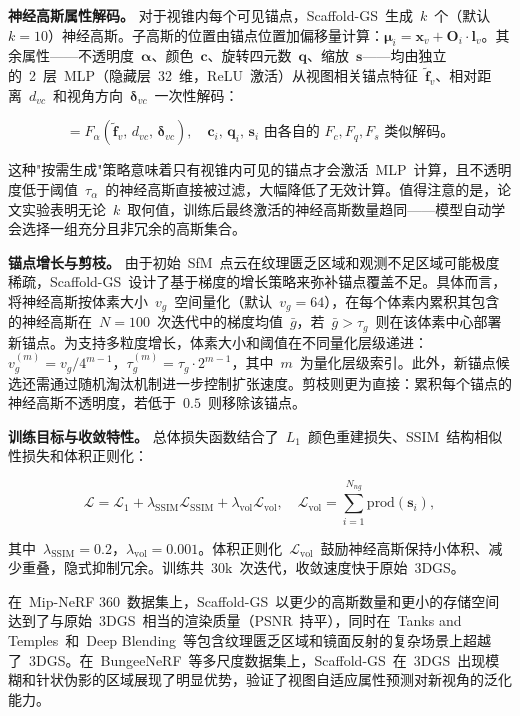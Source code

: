 \textbf{神经高斯属性解码。}
对于视锥内每个可见锚点，Scaffold-GS~生成~$k$~个（默认~$k=10$）神经高斯。子高斯的位置由锚点位置加偏移量计算：$\boldsymbol{\mu}_i = \mathbf{x}_v + \mathbf{O}_i \cdot \mathbf{l}_v$。其余属性——不透明度~$\boldsymbol{\alpha}$、颜色~$\mathbf{c}$、旋转四元数~$\mathbf{q}$、缩放~$\mathbf{s}$——均由独立的~2~层~MLP（隐藏层~32~维，ReLU~激活）从视图相关锚点特征~$\tilde{\mathbf{f}}_v$、相对距离~$d_{vc}$~和视角方向~$\boldsymbol{\delta}_{vc}$~一次性解码：

\begin{equation}
[\alpha_0, \ldots, \alpha_{k-1}] = F_\alpha(\tilde{\mathbf{f}}_v, \, d_{vc}, \, \boldsymbol{\delta}_{vc}), \quad \mathbf{c}_i, \, \mathbf{q}_i, \, \mathbf{s}_i \text{ 由各自的 } F_c, F_q, F_s \text{ 类似解码。}
\end{equation}

这种"按需生成"策略意味着只有视锥内可见的锚点才会激活~MLP~计算，且不透明度低于阈值~$\tau_\alpha$~的神经高斯直接被过滤，大幅降低了无效计算。值得注意的是，论文实验表明无论~$k$~取何值，训练后最终激活的神经高斯数量趋同——模型自动学会选择一组充分且非冗余的高斯集合。

\textbf{锚点增长与剪枝。}
由于初始~SfM~点云在纹理匮乏区域和观测不足区域可能极度稀疏，Scaffold-GS~设计了基于梯度的增长策略来弥补锚点覆盖不足。具体而言，将神经高斯按体素大小~$v_g$~空间量化（默认~$v_g = 64$），在每个体素内累积其包含的神经高斯在~$N=100$~次迭代中的梯度均值~$\bar{g}$，若~$\bar{g} > \tau_g$~则在该体素中心部署新锚点。为支持多粒度增长，体素大小和阈值在不同量化层级递进：$v_g^{(m)} = v_g / 4^{m-1}$，$\tau_g^{(m)} = \tau_g \cdot 2^{m-1}$，其中~$m$~为量化层级索引。此外，新锚点候选还需通过随机淘汰机制进一步控制扩张速度。剪枝则更为直接：累积每个锚点的神经高斯不透明度，若低于~$0.5$~则移除该锚点。

\textbf{训练目标与收敛特性。}
总体损失函数结合了~$L_1$~颜色重建损失、SSIM~结构相似性损失和体积正则化：

\begin{equation}
\mathcal{L} = \mathcal{L}_1 + \lambda_{\text{SSIM}} \mathcal{L}_{\text{SSIM}} + \lambda_{\text{vol}} \mathcal{L}_{\text{vol}}, \quad \mathcal{L}_{\text{vol}} = \sum_{i=1}^{N_{ng}} \text{prod}(\mathbf{s}_i),
\end{equation}

其中~$\lambda_{\text{SSIM}} = 0.2$，$\lambda_{\text{vol}} = 0.001$。体积正则化~$\mathcal{L}_{\text{vol}}$~鼓励神经高斯保持小体积、减少重叠，隐式抑制冗余。训练共~30k~次迭代，收敛速度快于原始~3DGS。

在~Mip-NeRF 360~数据集上，Scaffold-GS~以更少的高斯数量和更小的存储空间达到了与原始~3DGS~相当的渲染质量（PSNR~持平），同时在~Tanks and Temples~和~Deep Blending~等包含纹理匮乏区域和镜面反射的复杂场景上超越了~3DGS。在~BungeeNeRF~等多尺度数据集上，Scaffold-GS~在~3DGS~出现模糊和针状伪影的区域展现了明显优势，验证了视图自适应属性预测对新视角的泛化能力。

